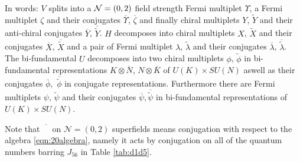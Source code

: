 \documentclass[main.tex]{subfiles}
\begin{document}
In words: $V$ splits into a $\mathcal{N}=(0,2)$ field strength Fermi multiplet $\Upsilon$, a Fermi multiplet $\zeta$ and their conjugates $\overline{\Upsilon}$, $\overline{\zeta}$ and finally chiral multiplets $Y$, $\widetilde{Y}$ and their anti-chiral conjugates $\overline{Y}$, $\overline{\widetilde{Y}}$. $H$ decomposes into chiral multiplets $X$, $\widetilde{X}$ and their conjugates $\overline{X}$, $\overline{\widetilde{X}}$ and a pair of Fermi multiplet $\lambda$, $\widetilde{\lambda}$ and their conjugates $\overline{\lambda}$, $\overline{\widetilde{\lambda}}$. The bi-fundamental $U$ decomposes into two chiral multiplets $\phi$, $\widetilde{\phi}$ in bi-fundamental representations $K\otimes\overline{N}$, $N\otimes\overline{K}$ of $U(K)\times SU(N)$ aswell as their conjugates $\overline{\phi},$ $\overline{\widetilde{\phi}}$ in conjugate representations. Furthermore there are Fermi multiplets $\psi$, $\widetilde{\psi}$ and their conjugates $\overline{\psi},\overline{\widetilde{\psi}}$ in bi-fundamental representations of $U(K)\times SU(N)$.

Note that $\overline{\phantom{X}}$ on $\mathcal{N}=(0,2)$ superfields means conjugation with respect to the algebra \eqref{eqn:20algebra}, namely it acts by conjugation on all of the quantum numbers barring $J_{56}$ in Table \ref{tab:d1d5}.
\end{document}

